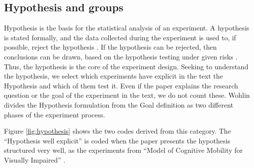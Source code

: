 	\begin{figure}[h] 

   	    \captionsetup{width=12cm}%
	\end{figure}



\subsection{Hypothesis and groups}
\label{subsec:results-hypothesis}

Hypothesis is the basis for the statistical analysis of an experiment. A hypothesis is stated formally, and the data collected during the experiment is used to, if possible, reject the hypothesis \cite{Wohlin2000}. If the hypothesis can be rejected, then conclusions can be drawn, based on the hypothesis testing under given risks \cite{Wohlin2000}. Thus, the hypothesis is the core of the experiment design. Seeking to understand the hypothesis, we select which experiments have explicit in the text the Hypothesis and which of them test it. Even if the paper explains the research question or the goal of the experiment in the text, we do not count these. Wohlin divides the Hypothesis formulation from the Goal definition as two different phases of the experiment process. 

Figure \ref{fig:hypothesis} shows the two codes derived from this category. The ``Hypothesis well explicit'' is coded when the paper presents the hypothesis structured very well, as the experiments from ``Model of Cognitive Mobility for Visually Impaired'' \cite{Pissaloux2017TowardsDevices}.

